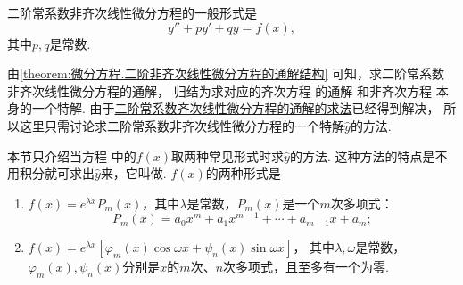二阶常系数非齐次线性微分方程的一般形式是
\begin{equation}\label{equation:微分方程.二阶常系数非齐次线性微分方程的一般形式}
y'' + p y' + q y = f(x),
\end{equation}
其中\(p,q\)是常数.

由\cref{theorem:微分方程.二阶非齐次线性微分方程的通解结构} 可知，求二阶常系数非齐次线性微分方程的通解，%
归结为求对应的齐次方程  的通解%
和非齐次方程  本身的一个特解.
由于\hyperref[section:微分方程.常系数齐次线性微分方程]{二阶常系数齐次线性微分方程的通解的求法}已经得到解决，%
所以这里只需讨论求二阶常系数非齐次线性微分方程的一个特解\(\hat{y}\)的方法.

本节只介绍当方程  中的\(f(x)\)取两种常见形式时求\(\hat{y}\)的方法.
这种方法的特点是不用积分就可求出\(\hat{y}\)来，它叫做.
\(f(x)\)的两种形式是\begin{enumerate}
\item \(f(x) = e^{\lambda x} P_m(x)\)，其中\(\lambda\)是常数，\(P_m(x)\)是一个\(m\)次多项式：\[
P_m(x) = a_0 x^m + a_1 x^{m-1} + \dotsb + a_{m-1} x + a_m;
\]

\item \(f(x) = e^{\lambda x} [ \varphi_m(x) \cos\omega x + \psi_n(x) \sin \omega x ]\)，%
其中\(\lambda,\omega\)是常数，\(\varphi_m(x),\psi_n(x)\)分别是\(x\)的\(m\)次、\(n\)次多项式，且至多有一个为零.
\end{enumerate}


